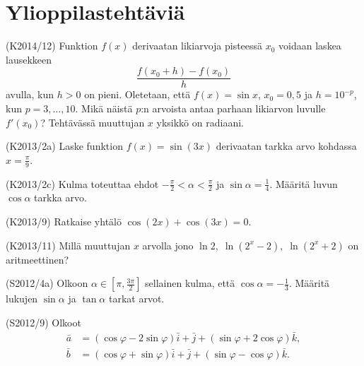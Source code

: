 \section{Ylioppilastehtäviä}

\begin{tehtava} (K2014/12)
	Funktion $f(x)$ derivaatan likiarvoja pisteessä $x_0$ voidaan laskea lausekkeen 
	\[\frac{f(x_0+h)-f(x_0)}{h}\] avulla, kun $h>0$ on pieni. Oletetaan, että $f(x)=\sin x$, 
	$x_0=0,5$ ja $h=10^{-p}$, kun $p=3,\ldots,10$. Mikä näistä $p$:n arvoista antaa parhaan 
	likiarvon luvulle $f'(x_0)$? Tehtävässä muuttujan $x$ yksikkö on radiaani.
\end{tehtava}

\begin{tehtava} (K2013/2a)
	Laske funktion $f(x)=\sin(3x)$ derivaatan tarkka arvo kohdassa $x=\frac{\pi}{9}$.
\end{tehtava}

\begin{tehtava} (K2013/2c)
	Kulma \alpha toteuttaa ehdot $-\frac{\pi}{2}<\alpha<\frac{\pi}{2}$ ja $\sin\alpha=\frac{1}{4}$.
	Määritä luvun $\cos\alpha$ tarkka arvo.
\end{tehtava}

\begin{tehtava} (K2013/9)
	Ratkaise yhtälö $\cos(2x)+\cos(3x)=0$.
\end{tehtava}

\begin{tehtava} (K2013/11)
	Millä muuttujan $x$ arvolla jono $\ln2, \; \ln(2^x-2), \; \ln(2^x+2)$ on aritmeettinen?
\end{tehtava}

\begin{tehtava} (S2012/4a)
	Olkoon $\alpha\in\left[\pi,\frac{3\pi}{2}\right]$ sellainen kulma, että $\cos\alpha=-\frac{1}{3}$.
	Määritä lukujen $\sin\alpha$ ja $\tan\alpha$ tarkat arvot.
\end{tehtava}

\begin{tehtava} (S2012/9)
	Olkoot 
	\begin{align*}
	\bar{a}&=(\cos\varphi-2\sin\varphi)\bar{i}+\bar{j}+(\sin\varphi+2\cos\varphi)\bar{k}, \\
	\bar{b}&=(\cos\varphi+\sin\varphi)\bar{i}+\bar{j}+(\sin\varphi-\cos\varphi)\bar{k}.
	\end{align*}
	
	\begin{alakohdat}
	\end{alakohdat}
\end{tehtava}


